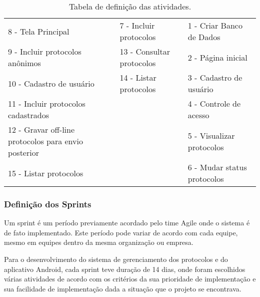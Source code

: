 \documentclass[
	article,			%
	11pt,				%
	oneside,			%
	a4paper,			%
	english,			%
	brazil,				%
	sumario=tradicional
	]{abntex2}
\begin{document}
\begin{table}[htbp]
    \caption{Tabela de definição das atividades.}
    \label{tabela-atividades}
    \begin{center}
        \begin{tabular}{|p{5cm}|p{4cm}|p{5cm}|}
            \hline
            8 - Tela Principal & 7 - Incluir protocolos & 1 - Criar Banco de Dados \\
            9 - Incluir protocolos anônimos & 13 - Consultar protocolos & 2 - Página inicial \\
            10 - Cadastro de usuário & 14 - Listar protocolos & 3 - Cadastro de usuário \\
            11 - Incluir protocolos cadastrados & & 4 - Controle de acesso \\
            12 - Gravar off-line protocolos para envio posterior & & 5 - Visualizar protocolos \\
            15 - Listar protocolos & & 6 - Mudar status protocolos \\
            \hline
        \end{tabular}
    \end{center}
\end{table}








\subsubsection{Definição dos Sprints}

Um sprint é um período previamente acordado pelo time Agile onde o sistema é de
fato implementado. Este período pode variar de acordo com cada equipe, mesmo em
equipes dentro da mesma organização ou empresa.

Para o desenvolvimento do sistema de gerenciamento dos protocolos e do aplicativo
Android, cada sprint teve duração de 14 dias, onde foram escolhidos várias
atividades de acordo com os critérios da sua prioridade de implementação e sua
facilidade de implementação dada a situação que o projeto se encontrava.
\end{document}
